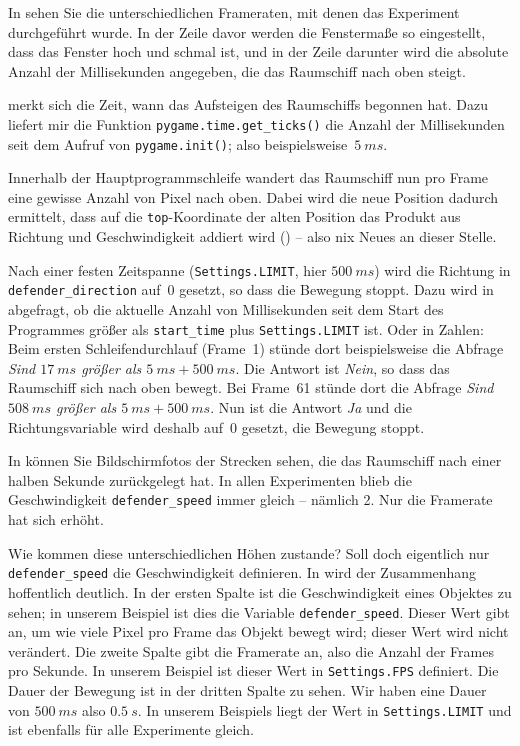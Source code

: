 In  sehen Sie die unterschiedlichen Frameraten, mit denen das Experiment durchgeführt wurde. In der Zeile davor werden die Fenstermaße so eingestellt, dass das Fenster hoch und schmal ist, und in der Zeile darunter wird die absolute Anzahl der Millisekunden angegeben, die das Raumschiff nach oben steigt.

 merkt sich die Zeit, wann das Aufsteigen des Raumschiffs begonnen hat. Dazu liefert mir die Funktion \texttt{pygame.time.get\_ticks()} die Anzahl der Millisekunden seit dem Aufruf von \texttt{pygame.init()}; also beispielsweise~$5~ms$.

Innerhalb der Hauptprogrammschleife wandert das Raumschiff nun pro Frame eine gewisse Anzahl von Pixel nach oben. Dabei wird die neue Position dadurch ermittelt, dass auf die \texttt{top}-Koordinate der alten Position das Produkt aus Richtung und Geschwindigkeit addiert wird () -- also nix Neues an dieser Stelle.

Nach einer festen Zeitspanne (\texttt{Settings.LIMIT}, hier $500~ms$) wird die Richtung in \texttt{defender\_direction} auf~0 gesetzt, so dass die Bewegung stoppt. Dazu wird in  abgefragt, ob die aktuelle Anzahl von Millisekunden seit dem Start des Programmes größer als \texttt{start\_time} plus \texttt{Settings.LIMIT} ist. Oder in Zahlen: Beim ersten Schleifendurchlauf (Frame~1) stünde dort beispielsweise die Abfrage \emph{Sind $17~ms$ größer als $5~ms + 500~ms$}. Die Antwort ist \emph{Nein}, so dass das Raumschiff sich nach oben bewegt. Bei Frame~61 stünde dort die Abfrage \emph{Sind $508~ms$ größer als $5~ms + 500~ms$}. Nun ist die Antwort \emph{Ja} und die Richtungsvariable wird deshalb auf~0 gesetzt, die Bewegung stoppt.


In  können Sie Bildschirmfotos der Strecken sehen, die das Raumschiff nach einer halben Sekunde zurückgelegt hat. In allen Experimenten blieb die Geschwindigkeit \texttt{defender\_speed} immer gleich -- nämlich 2. Nur die Framerate hat sich erhöht.

Wie kommen diese unterschiedlichen Höhen zustande? Soll doch eigentlich nur \texttt{de\-fen\-der\-\_speed} die Geschwindigkeit definieren. In  wird der Zusammenhang hoffentlich deutlich. In der ersten Spalte ist die Geschwindigkeit eines Objektes zu sehen; in unserem Beispiel ist dies die Variable \texttt{defender\_speed}. Dieser Wert gibt an, um wie viele Pixel pro Frame das Objekt bewegt wird; dieser Wert wird nicht verändert. Die zweite Spalte gibt die Framerate an, also die Anzahl der Frames pro Sekunde. In unserem Beispiel ist dieser Wert in \texttt{Settings.FPS} definiert. Die Dauer der Bewegung ist in der dritten Spalte zu sehen. Wir haben eine Dauer von $500~ms$ also $0.5~s$. In unserem Beispiels liegt der Wert in \texttt{Settings.LIMIT} und ist ebenfalls für alle Experimente gleich. 

